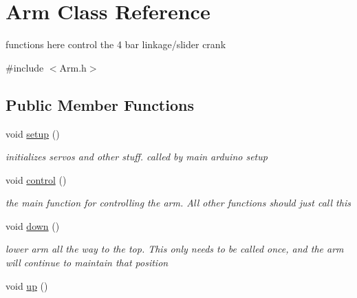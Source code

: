 \hypertarget{classArm}{\section{Arm Class Reference}
\label{classArm}
}


functions here control the 4 bar linkage/slider crank  




{\ttfamily \#include $<$Arm.\-h$>$}

\subsection*{Public Member Functions}
\begin{DoxyCompactItemize}
\item 
\hypertarget{classArm_a0e642e1a6fc24f40268f2c759dee62e1}{void \hyperlink{classArm_a0e642e1a6fc24f40268f2c759dee62e1}{setup} ()}\label{classArm_a0e642e1a6fc24f40268f2c759dee62e1}

\begin{DoxyCompactList}\small\item\em initializes servos and other stuff. called by main arduino setup \end{DoxyCompactList}\item 
\hypertarget{classArm_a009c19e5b213f692c24eab792cc40c47}{void \hyperlink{classArm_a009c19e5b213f692c24eab792cc40c47}{control} ()}\label{classArm_a009c19e5b213f692c24eab792cc40c47}

\begin{DoxyCompactList}\small\item\em the main function for controlling the arm. All other functions should just call this \end{DoxyCompactList}\item 
\hypertarget{classArm_a9075166ca53ef3cd547a7725ee5bca1d}{void \hyperlink{classArm_a9075166ca53ef3cd547a7725ee5bca1d}{down} ()}\label{classArm_a9075166ca53ef3cd547a7725ee5bca1d}

\begin{DoxyCompactList}\small\item\em lower arm all the way to the top. This only needs to be called once, and the arm will continue to maintain that position \end{DoxyCompactList}\item 
\hypertarget{classArm_a65ffd463407a6782a55dbd5b84f1e15e}{void \hyperlink{classArm_a65ffd463407a6782a55dbd5b84f1e15e}{up} ()}\label{classArm_a65ffd463407a6782a55dbd5b84f1e15e}


\end{DoxyCompactItemize}
